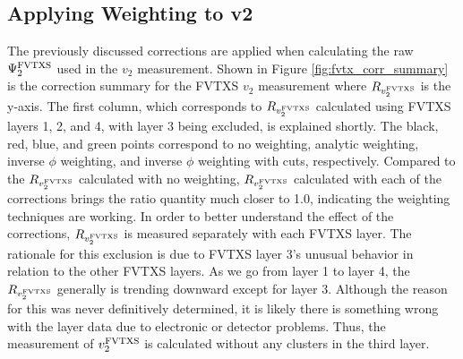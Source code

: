 \subsection{Applying Weighting to v2}
The previously discussed corrections are applied when calculating the raw $\Psi_2^{\rm FVTXS}$ used in the $v_2$ measurement. Shown in Figure \ref{fig:fvtx_corr_summary} is the correction summary for the FVTXS $v_2$ measurement where $R_{v_2^{\rm FVTXS}}$ is the y-axis. The first column, which corresponds to $R_{v_2^{\rm FVTXS}}$ calculated using FVTXS layers 1, 2, and 4, with layer 3 being excluded, is explained shortly. The black, red, blue, and green points correspond to no weighting, analytic weighting, inverse $\phi$ weighting, and inverse $\phi$ weighting with cuts, respectively. Compared to the $R_{v_2^{\rm FVTXS}}$ calculated with no weighting, $R_{v_2^{\rm FVTXS}}$ calculated with each of the corrections brings the ratio quantity much closer to 1.0, indicating the weighting techniques are working.  In order to better understand the effect of the corrections, $R_{v_2^{\rm FVTXS}}$ is measured separately with each FVTXS layer. The rationale for this exclusion is due to FVTXS layer 3's unusual behavior in relation to the other FVTXS layers. As we go from layer 1 to layer 4, the $R_{v_2^{\rm FVTXS}}$ generally is trending downward except for layer 3. Although the reason for this was never definitively determined, it is likely there is something wrong with the layer data due to electronic or detector problems. Thus, the measurement of $v_2^{\rm FVTXS}$ is calculated without any clusters in the third layer.

